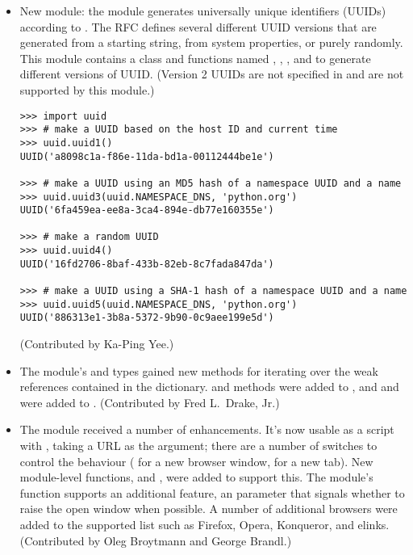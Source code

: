 \documentclass{howto}
\begin{document}
\begin{itemize}
\item New module: the   module generates 
universally unique identifiers (UUIDs) according to .  The
RFC defines several different UUID versions that are generated from a
starting string, from system properties, or purely randomly.  This
module contains a  class and 
functions named ,
, ,  and 
 to generate different versions of UUID.  (Version 2 UUIDs 
are not specified in  and are not supported by this module.)

\begin{verbatim}
>>> import uuid
>>> # make a UUID based on the host ID and current time
>>> uuid.uuid1()
UUID('a8098c1a-f86e-11da-bd1a-00112444be1e')

>>> # make a UUID using an MD5 hash of a namespace UUID and a name
>>> uuid.uuid3(uuid.NAMESPACE_DNS, 'python.org')
UUID('6fa459ea-ee8a-3ca4-894e-db77e160355e')

>>> # make a random UUID
>>> uuid.uuid4()
UUID('16fd2706-8baf-433b-82eb-8c7fada847da')

>>> # make a UUID using a SHA-1 hash of a namespace UUID and a name
>>> uuid.uuid5(uuid.NAMESPACE_DNS, 'python.org')
UUID('886313e1-3b8a-5372-9b90-0c9aee199e5d')
\end{verbatim}

(Contributed by Ka-Ping Yee.)

\item The  module's  and
 types gained new methods for iterating
over the weak references contained in the dictionary. 
 and  methods were
added to , and
 and  were added to
.  (Contributed by Fred L.~Drake, Jr.)

\item The  module received a number of
enhancements.
It's now usable as a script with , taking a
URL as the argument; there are a number of switches 
to control the behaviour ( for a new browser window, 
 for a new tab).  New module-level functions,
 and , were added 
to support this.  The module's  function supports an
additional feature, an  parameter that signals whether
to raise the open window when possible. A number of additional
browsers were added to the supported list such as Firefox, Opera,
Konqueror, and elinks.  (Contributed by Oleg Broytmann and George
Brandl.)



\end{itemize}
\end{document}
